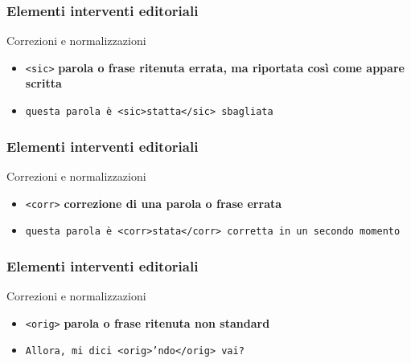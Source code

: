 \begin{frame}
    \frametitle{Elementi interventi editoriali}
    \addtocounter{nframe}{1}
    

    \begin{block}{Correzioni e normalizzazioni}
        \begin{itemize}
            \item \texttt{<sic>} \textbf{parola o frase ritenuta errata, ma riportata così come appare scritta}
            \item[] \texttt{questa parola è <sic>statta</sic> sbagliata}
        \end{itemize}
        
    \end{block}
    
\end{frame}

\begin{frame}
    \frametitle{Elementi interventi editoriali}
    \addtocounter{nframe}{1}
    

    \begin{block}{Correzioni e normalizzazioni}
        \begin{itemize}
            \item \texttt{<corr>} \textbf{correzione di una parola o frase errata}
            \item[] \texttt{questa parola è <corr>stata</corr> corretta in un secondo momento}
        \end{itemize}
        
    \end{block}
    
\end{frame}

\begin{frame}
    \frametitle{Elementi interventi editoriali}
    \addtocounter{nframe}{1}
    

    \begin{block}{Correzioni e normalizzazioni}
        \begin{itemize}
            \item \texttt{<orig>} \textbf{parola o frase ritenuta non standard}
            \item[] \texttt{Allora, mi dici <orig>'ndo</orig> vai?}
        \end{itemize}
        
    \end{block}
    
\end{frame}

